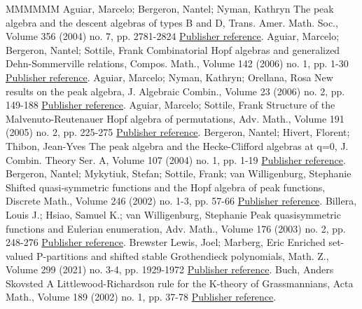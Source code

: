 \documentclass[11pt]{article}
\theoremstyle{definition}
\numberwithin{equation}{section}
\numberwithin{equation}{section}
\begin{document}
\begin{thebibliography}{MMMMMM}
 Aguiar, Marcelo; Bergeron, Nantel; Nyman, Kathryn The peak algebra and the descent algebras of types B and D, Trans. Amer. Math. Soc., Volume 356 (2004) no. 7, pp. 2781-2824 \href{https://alco.centre-mersenne.org/articles/10.5802/alco.362/#AguiarBergeronNyman}{Publisher reference}.
 Aguiar, Marcelo; Bergeron, Nantel; Sottile, Frank Combinatorial Hopf algebras and generalized Dehn-Sommerville relations, Compos. Math., Volume 142 (2006) no. 1, pp. 1-30 \href{https://alco.centre-mersenne.org/articles/10.5802/alco.362/#ABS}{Publisher reference}.
 Aguiar, Marcelo; Nyman, Kathryn; Orellana, Rosa New results on the peak algebra, J. Algebraic Combin., Volume 23 (2006) no. 2, pp. 149-188 \href{https://alco.centre-mersenne.org/articles/10.5802/alco.362/#AguiarNymanOrellana}{Publisher reference}.
 Aguiar, Marcelo; Sottile, Frank Structure of the Malvenuto-Reutenauer Hopf algebra of permutations, Adv. Math., Volume 191 (2005) no. 2, pp. 225-275 \href{https://alco.centre-mersenne.org/articles/10.5802/alco.362/#AguiarSottile}{Publisher reference}.
 Bergeron, Nantel; Hivert, Florent; Thibon, Jean-Yves The peak algebra and the Hecke-Clifford algebras at q=0, J. Combin. Theory Ser. A, Volume 107 (2004) no. 1, pp. 1-19 \href{https://alco.centre-mersenne.org/articles/10.5802/alco.362/#BergeronHivertThibon}{Publisher reference}.
 Bergeron, Nantel; Mykytiuk, Stefan; Sottile, Frank; van Willigenburg, Stephanie Shifted quasi-symmetric functions and the Hopf algebra of peak functions, Discrete Math., Volume 246 (2002) no. 1-3, pp. 57-66 \href{https://alco.centre-mersenne.org/articles/10.5802/alco.362/#BMSW}{Publisher reference}.
 Billera, Louis J.; Hsiao, Samuel K.; van Willigenburg, Stephanie Peak quasisymmetric functions and Eulerian enumeration, Adv. Math., Volume 176 (2003) no. 2, pp. 248-276 \href{https://alco.centre-mersenne.org/articles/10.5802/alco.362/#BilleraHsiaoWill}{Publisher reference}.
 Brewster Lewis, Joel; Marberg, Eric Enriched set-valued P-partitions and shifted stable Grothendieck polynomials, Math. Z., Volume 299 (2021) no. 3-4, pp. 1929-1972 \href{https://alco.centre-mersenne.org/articles/10.5802/alco.362/#LM2019}{Publisher reference}.
 Buch, Anders Skovsted A Littlewood-Richardson rule for the K-theory of Grassmannians, Acta Math., Volume 189 (2002) no. 1, pp. 37-78 \href{https://alco.centre-mersenne.org/articles/10.5802/alco.362/#Buch2002}{Publisher reference}.

\end{thebibliography}
\end{document}
